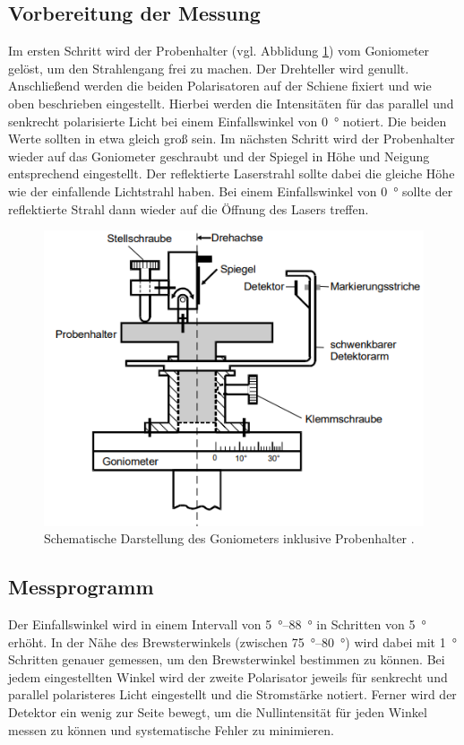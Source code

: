 \subsection{Vorbereitung der Messung}
Im ersten Schritt wird der Probenhalter (vgl. Abblidung \ref{fig:goniometer}) vom Goniometer gelöst, um den Strahlengang frei zu machen.
Der Drehteller wird genullt.
Anschließend werden die beiden Polarisatoren auf der Schiene fixiert und wie oben beschrieben eingestellt.
Hierbei werden die Intensitäten für das parallel und senkrecht polarisierte Licht bei einem Einfallswinkel von \qty{0}{\degree} notiert.
Die beiden Werte sollten in etwa gleich groß sein.
Im nächsten Schritt wird der Probenhalter wieder auf das Goniometer geschraubt und der Spiegel in Höhe und Neigung entsprechend eingestellt.
Der reflektierte Laserstrahl sollte dabei die gleiche Höhe wie der einfallende Lichtstrahl haben.
Bei einem Einfallswinkel von \qty{0}{\degree} sollte der reflektierte Strahl dann wieder auf die Öffnung des Lasers treffen.

\begin{figure}[H]
    \centering
    \includegraphics[height = 6 cm]{Abbildungen/goniometer.png}
    \caption{Schematische Darstellung des Goniometers inklusive Probenhalter \cite{man:v407}.}
    \label{fig:goniometer}
\end{figure}


\subsection{Messprogramm}
Der Einfallswinkel wird in einem Intervall von \qtyrange{5}{88}{\degree} in Schritten von \qty{5}{\degree} erhöht.
In der Nähe des Brewsterwinkels (zwischen \qtyrange{75}{80}{\degree}) wird dabei mit \qty{1}{\degree} Schritten genauer gemessen, 
um den Brewsterwinkel bestimmen zu können.
Bei jedem eingestellten Winkel wird der zweite Polarisator jeweils für senkrecht und parallel polaristeres Licht eingestellt
und die Stromstärke notiert.
Ferner wird der Detektor ein wenig zur Seite bewegt, um die Nullintensität für jeden Winkel messen zu können 
und systematische Fehler zu minimieren.

